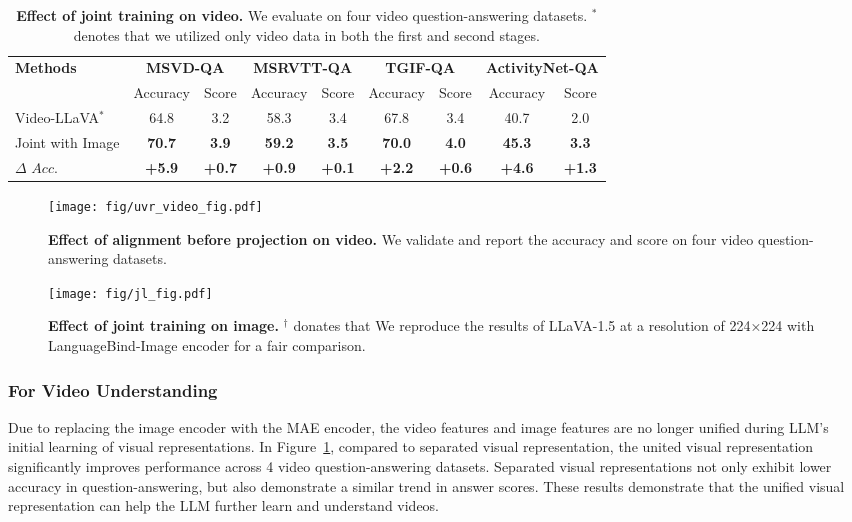 \begin{table*}[t]
  \setlength\tabcolsep{0.5mm}
  \caption{\textbf{Effect of joint training on video.} We evaluate on four video question-answering datasets. $^*$ denotes that we utilized only video data in both the first and second stages.}
  \label{tab:jl_tab}
  \centering
  \begin{tabular}{l|cc|cc|cc|cc}
    \toprule
    \multirow{2}{*}{\textbf{Methods}} & \multicolumn{2}{c|}{\textbf{MSVD-QA}} & \multicolumn{2}{c|}{\textbf{MSRVTT-QA}} & \multicolumn{2}{c|}{\textbf{TGIF-QA}} & \multicolumn{2}{c}{\textbf{ActivityNet-QA}} \\
     & Accuracy & Score & Accuracy & Score & Accuracy & Score & Accuracy & Score \\
     \midrule
    Video-LLaVA$^*$ & 64.8 & 3.2 & 58.3 & 3.4 & 67.8 & 3.4 & 40.7 & 2.0 \\
    Joint with Image & \textbf{70.7} & \textbf{3.9} & \textbf{59.2} & \textbf{3.5} & \textbf{70.0} & \textbf{4.0} & \textbf{45.3} & \textbf{3.3} \\
    $\Delta$ \textcolor{sgreen}{$Acc.$} & \textcolor{sgreen}{{\textbf{+5.9}}} & \textcolor{sgreen}{{\textbf{+0.7}}} & \textcolor{sgreen}{{\textbf{+0.9}}} & \textcolor{sgreen}{{\textbf{+0.1}}} & \textcolor{sgreen}{{\textbf{+2.2}}} & \textcolor{sgreen}{{\textbf{+0.6}}} & \textcolor{sgreen}{{\textbf{+4.6}}} & \textcolor{sgreen}{{\textbf{+1.3}}} \\
    \bottomrule
  \end{tabular}
\end{table*}

\begin{figure}[t]
\centering
    \texttt{[image: fig/uvr\_video\_fig.pdf]}     
  \caption{\textbf{Effect of alignment before projection on video.} We validate and report the accuracy and score on four video question-answering datasets.}
\label{fig:uvr_video}
\end{figure}

\begin{figure}[t]
\centering
    \texttt{[image: fig/jl\_fig.pdf]}     
\caption{\textbf{Effect of joint training on image.} $^\dag$  donates that We reproduce the results of LLaVA-1.5 at a resolution of 224×224 
 with LanguageBind-Image encoder for a fair comparison.}
\label{fig:jl_fig}
\end{figure}

\subsubsection{For Video Understanding} Due to replacing the image encoder with the MAE encoder, the video features and image features are no longer unified during LLM's initial learning of visual representations. In Figure~\ref{fig:uvr_video}, compared to separated visual representation, the united visual representation significantly improves performance across 4 video question-answering datasets. Separated visual representations not only exhibit lower accuracy in question-answering, but also demonstrate a similar trend in answer scores. These results demonstrate that the unified visual representation can help the LLM further learn and understand videos.


